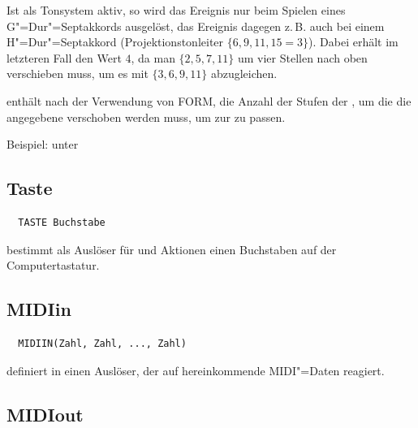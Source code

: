 Ist  als Tonsystem aktiv, so wird das Ereignis  nur 
beim Spielen eines G"=Dur"=Septakkords ausgelöst, das Ereignis 
 dagegen z.\,B. auch bei einem H"=Dur"=Septakkord (Projektionstonleiter 
$\{6,9,11,15=3\}$). Dabei erhält im letzteren Fall  den 
Wert $4$, da man $\{2,5,7,11\}$ um vier Stellen nach oben verschieben 
muss, um es mit $\{3,6,9,11\}$ abzugleichen. 


\label{sec:SX_DISTANCE}

 enthält nach der Verwendung von FORM, die Anzahl der
Stufen der , um
die die angegebene  verschoben werden muss, um zur
 zu passen.


Beispiel: unter 


\subsection{Taste}
\label{sec:SX_KEY}



\begin{verbatim}
  TASTE Buchstabe
\end{verbatim}




 bestimmt als Auslöser für
 und Aktionen einen Buchstaben auf der
Computertastatur.

\subsection{MIDIin}
\label{sec:SX_MIDIIN}



\begin{verbatim}
  MIDIIN(Zahl, Zahl, ..., Zahl)
\end{verbatim}





 definiert in  einen Auslöser, der 
auf hereinkommende MIDI"=Daten reagiert.


\subsection{MIDIout}
\label{sec:SX_MIDIOUT}

